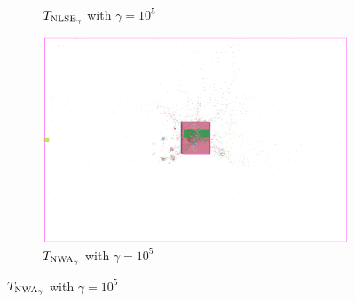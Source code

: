 \begin{figure}
\begin{subfigure}{.32\textwidth}
  \caption{\(T_{\operatorname{NLSE}_\gamma}\) with \(\gamma = 10^5\)}
 \end{subfigure}
 \hfill
 \begin{subfigure}{.32\textwidth}
  \includegraphics[width=\textwidth]{start_vectors/convergence_Chip1_WA_random_100000_gamma.png}  
  \caption{\(T_{\operatorname{NWA}_\gamma}\) with \(\gamma = 10^5\)}
 \end{subfigure}

 \bigskip
 

\end{figure}
